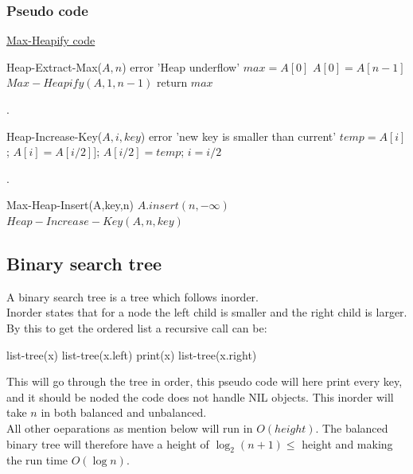 \documentclass[12pt, a4paper]{article}
\begin{document}
				\subsubsection{Pseudo code}
					\hyperref[code:MaxHeapify]{Max-Heapify code}
				\begin{algorithmic}[1]
					\State Heap-Extract-Max($A,n$)
						\State error 'Heap underflow'
					\EndIf
					\State $max = A[0]$
					\State $A[0] = A[n-1]$
					\State $Max-Heapify(A,1,n-1)$
					\State return $max$
				\end{algorithmic}
				.\\[3mm]
				\begin{algorithmic}[1]
					\State Heap-Increase-Key($A,i,key$)
						\State error 'new key is smaller than current'
					\EndIf
							\State $temp = A[i]$;
							\State $A[i] = A[i/2]]$;
							\State $A[i/2] = temp$;
							\State $i=i/2$
					\EndWhile
					\end{algorithmic}
				.\\[3mm]
					\begin{algorithmic}[1]
						\State Max-Heap-Insert(A,key,n)
						\State $A.insert(n,-\infty)$
						\State $Heap-Increase-Key(A,n,key)$
					\end{algorithmic}
			\subsection{Binary search tree}
				A binary search tree is a tree which follows inorder.\\
				Inorder states that for a node the left child is smaller and the right child is larger.\\
				By this to get the ordered list a recursive call can be:
				\begin{algorithmic}[1]
					\State list-tree(x)
					\State list-tree(x.left)
					\State print(x)
					\State list-tree(x.right)
				\end{algorithmic}
				This will go through the tree in order, this pseudo code will here print every key, and it should be noded the code does not handle NIL objects. This inorder will take $n$ in both balanced and unbalanced.\\
				All other oeparations as mention below will run in $O(height)$. The balanced binary tree will therefore have a height of $\log_2 (n+1) \leq $ height and making the run time $O(\log n)$.
\end{document}
